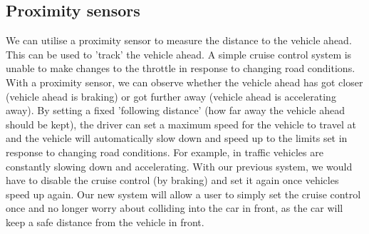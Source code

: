 \documentclass[12pt]{article}
\numberwithin{equation}{section}
\begin{document}
\subsection*{Proximity sensors}
We can utilise a proximity sensor to measure the distance to the vehicle ahead. This can be used to 'track' the vehicle ahead. A simple cruise control system is unable to make changes to the throttle in response to changing road conditions. With a proximity sensor, we can observe whether the vehicle ahead has got closer (vehicle ahead is braking) or got further away (vehicle ahead is accelerating away). By setting a fixed 'following distance' (how far away the vehicle ahead should be kept), the driver can set a maximum speed for the vehicle to travel at and the vehicle will automatically slow down and speed up to the limits set in response to changing road conditions. For example, in traffic vehicles are constantly slowing down and accelerating. With our previous system, we would have to disable the cruise control (by braking) and set it again once vehicles speed up again. Our new system will allow a user to simply set the cruise control once and no longer worry about colliding into the car in front, as the car will keep a safe distance from the vehicle in front.
\end{document}
